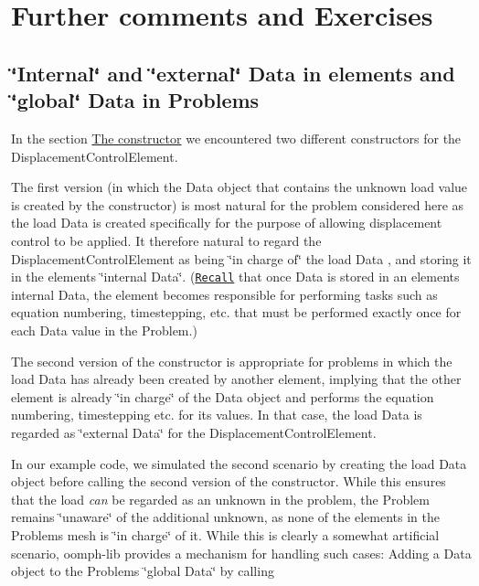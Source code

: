 \hypertarget{index_further}{}\section{Further comments and Exercises}\label{index_further}
\hypertarget{index_global_data}{}\subsection{\char`\"{}\+Internal\char`\"{} and \char`\"{}external\char`\"{} Data in elements and \char`\"{}global\char`\"{} Data in Problems}\label{index_global_data}
In the section \hyperlink{index_constructor}{The constructor} we encountered two different constructors for the {\ttfamily Displacement\+Control\+Element}.
\begin{DoxyItemize}
\item The first version (in which the {\ttfamily Data} object that contains the unknown load value is created by the constructor) is most natural for the problem considered here as the load {\ttfamily Data} is created specifically for the purpose of allowing displacement control to be applied. It therefore natural to regard the {\ttfamily Displacement\+Control\+Element} as being \char`\"{}in charge of\char`\"{} the load {\ttfamily Data} , and storing it in the element\textquotesingle{}s \char`\"{}internal Data\char`\"{}. (\href{../../../the_data_structure/html/index.html}{\tt Recall} that once {\ttfamily Data} is stored in an element\textquotesingle{}s internal {\ttfamily Data}, the element becomes responsible for performing tasks such as equation numbering, timestepping, etc. that must be performed exactly once for each {\ttfamily Data} value in the {\ttfamily Problem}.) ~\newline
~\newline

\item The second version of the constructor is appropriate for problems in which the load {\ttfamily Data} has already been created by another element, implying that the other element is already \char`\"{}in charge\char`\"{} of the {\ttfamily Data} object and performs the equation numbering, timestepping etc. for its values. In that case, the load {\ttfamily Data} is regarded as \char`\"{}external Data\char`\"{} for the {\ttfamily Displacement\+Control\+Element}.
\end{DoxyItemize}In our example code, we simulated the second scenario by creating the load {\ttfamily Data} object before calling the second version of the constructor. While this ensures that the load {\itshape can} be regarded as an unknown in the problem, the {\ttfamily Problem} remains \char`\"{}unaware\char`\"{} of the additional unknown, as none of the elements in the {\ttfamily Problem\textquotesingle{}s} mesh is \char`\"{}in charge\char`\"{} of it. While this is clearly a somewhat artificial scenario, {\ttfamily oomph-\/lib} provides a mechanism for handling such cases\+: Adding a {\ttfamily Data} object to the {\ttfamily Problem\textquotesingle{}s} \char`\"{}global Data\char`\"{} by calling


